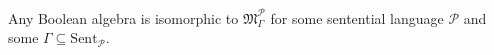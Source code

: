 Any Boolean algebra is isomorphic to $\mathfrak{M}_{\Gamma}^{\mathcal{P}}$ for some sentential language $\mathcal{P}$ and some $\Gamma \subseteq \text{Sent}_{\mathcal{P}}$.
